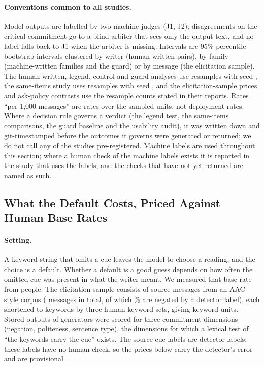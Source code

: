 \paragraph{Conventions common to all studies.}
Model outputs are labelled by two machine judges (J1, J2); disagreements on the critical commitment go to a blind arbiter that sees only the output text, and no label falls back to J1 when the arbiter is missing. Intervals are 95\% percentile bootstrap intervals clustered by writer (human-written pairs), by family (machine-written families and the guard) or by message (the elicitation sample). The human-written, legend, control and guard analyses use \jmconvBoot{} resamples with seed \jmconvSeed{}, the same-items study uses \jmconvBootFOne{} resamples with seed \jmconvSeedFOne{}, and the elicitation-sample prices and ask-policy contrasts use the resample counts stated in their reports. Rates ``per 1,000 messages'' are rates over the sampled units, not deployment rates. Where a decision rule governs a verdict (the legend test, the same-items comparisons, the guard baseline and the usability audit), it was written down and git-timestamped before the outcomes it governs were generated or returned; we do not call any of the studies pre-registered. Machine labels are used throughout this section; where a human check of the machine labels exists it is reported in the study that uses the labels, and the checks that have not yet returned are named as such.

\subsection{What the Default Costs, Priced Against Human Base Rates}\label{sec:basecost}

\paragraph{Setting.}
A keyword string that omits a cue leaves the model to choose a reading, and the choice is a default. Whether a default is a good guess depends on how often the omitted cue was present in what the writer meant. We measured that base rate from people. The elicitation sample consists of \jmtTwoMessages{} source messages from an AAC-style corpus (\jmtTwoCorpus{} messages in total, of which \jmtTwoCorpusNeg{}\% are negated by a detector label), each shortened to keywords by three human keyword sets, giving \jmtTwoUnits{} keyword units. Stored outputs of \jmbreadthOrigModels{} generators were scored for three commitment dimensions (negation, politeness, sentence type), the dimensions for which a lexical test of ``the keywords carry the cue'' exists. The source cue labels are detector labels; these labels have no human check, so the prices below carry the detector's error and are provisional.

